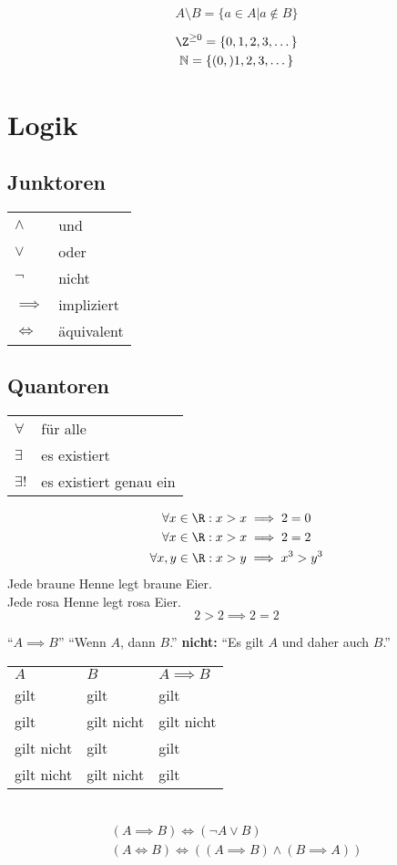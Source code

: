 \[ A \setminus B = \{ a \in A | a \notin B \} \]

\begin{gather*}
	\Z^{\geq 0} = \{0, 1, 2, 3, \dotsc \} \\
	\N = \{ (0,) 1, 2, 3, \dotsc \}
\end{gather*}

\section{Logik}
\subsection{Junktoren}
\begin{tabular}{ll}
	$\wedge$	&und			\\
	$\vee$	&oder		\\
	$\neg$	&nicht		\\
	$\implies$	&impliziert		\\
	$\iff$	&äquivalent	
\end{tabular}

\subsection{Quantoren}
\begin{tabular}{ll}
	$\forall$	&für alle				\\
	$\exists$	&es existiert			\\
	$\exists!$	&es existiert genau ein	
\end{tabular}

\begin{bsp*}
	\begin{gather*}
		\forall x \in \R : x > x \implies 2 = 0 \\
		\forall x \in \R : x > x \implies 2 = 2 \\
		\forall x, y \in \R : x > y \implies x^3 > y^3 \\
	\end{gather*}
	Jede braune Henne legt braune Eier.\\
	Jede rosa Henne legt rosa Eier.\\
	\[ 2 > 2 \implies 2 =2 \]
\end{bsp*}

\enquote{$A \implies B$} \qquad \enquote{Wenn $A$, dann $B$.} \qquad \textbf{nicht:} \enquote{Es gilt $A$ und daher auch $B$.} \\
\begin{tabular}{lll}
	$A$		&$B$		&$A \implies B$	\\
	gilt		&gilt		&gilt			\\
	gilt		&gilt nicht	&gilt nicht		\\
	gilt nicht	&gilt		&gilt			\\
	gilt nicht	&gilt nicht	&gilt			
\end{tabular}\\
\begin{gather*}
	(A \implies B) \iff (\neg A \vee B) \\
	(A \iff B) \iff ((A \implies B) \wedge (B \implies A))
\end{gather*}

